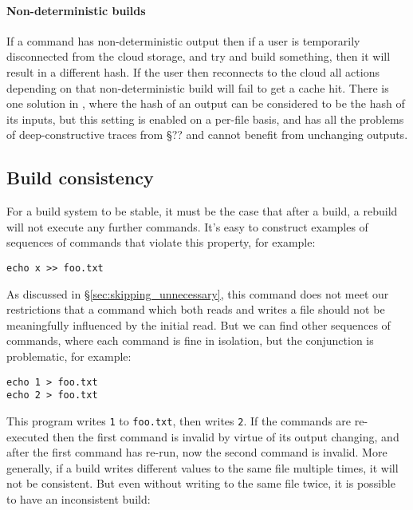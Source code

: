 \paragraph{Non-deterministic builds} If a command has non-deterministic output then if a user is temporarily disconnected from the cloud storage, and try and build something, then it will result in a different hash. If the user then reconnects to the cloud all actions depending on that non-deterministic build will fail to get a cache hit. There is one solution in \Rattle, where the hash of an output can be considered to be the hash of its inputs, but this setting is enabled on a per-file basis, and has all the problems of deep-constructive traces from \cite{build_systems_a_la_carte} \S?? and cannot benefit from unchanging outputs.

\subsection{Build consistency}
\label{sec:hazards}

For a \Make build system to be stable, it must be the case that after a build, a rebuild will not execute any further commands. It's easy to construct examples of sequences of commands that violate this property, for example:

\begin{verbatim}
echo x >> foo.txt
\end{verbatim}


As discussed in \S\ref{sec:skipping_unnecessary}, this command does not meet our restrictions that a command which both reads and writes a file should not be meaningfully influenced by the initial read. But we can find other sequences of commands, where each command is fine in isolation, but the conjunction is problematic, for example:

\begin{verbatim}
echo 1 > foo.txt
echo 2 > foo.txt
\end{verbatim}

This program writes \texttt{1} to \texttt{foo.txt}, then writes \texttt{2}. If the commands are re-executed then the first command is invalid by virtue of its output changing, and after the first command has re-run, now the second command is invalid. More generally, if a build writes different values to the same file multiple times, it will not be consistent. But even without writing to the same file twice, it is possible to have an inconsistent build:

